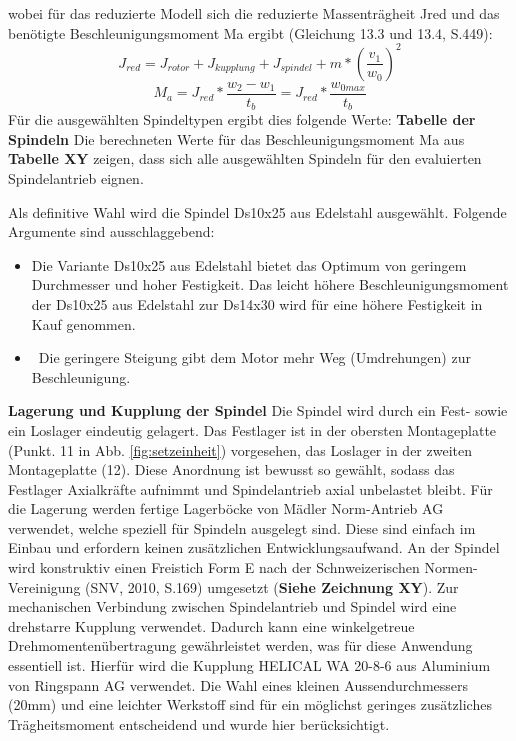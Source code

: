 wobei für das reduzierte Modell sich die reduzierte Massenträgheit Jred und das benötigte Beschleunigungsmoment Ma ergibt (Gleichung 13.3 und 13.4, S.449):
\begin{equation}
J_{red}=J_{rotor}+J_{kupplung}+J_{spindel}+m*(\frac{v_{1}}{w_{0}})^{2}
\end{equation}
\begin{equation}
M_{a}=J_{red}*\frac{w_{2}-w_{1}}{t_{b}}=J_{red}*\frac{w_{0max}}{t_{b}}
\end{equation}
Für die ausgewählten Spindeltypen ergibt dies folgende Werte:
\newline
\textbf{Tabelle der Spindeln}
Die berechneten Werte für das Beschleunigungsmoment Ma aus \textbf{Tabelle XY} zeigen, dass sich alle ausgewählten Spindeln für den evaluierten Spindelantrieb eignen.
\newline
\newline

Als definitive Wahl wird die Spindel Ds10x25 aus Edelstahl ausgewählt. Folgende Argumente sind ausschlaggebend:
	\begin{itemize}
	\item Die Variante Ds10x25 aus Edelstahl bietet das Optimum von geringem Durchmesser und hoher Festigkeit. Das leicht höhere Beschleunigungsmoment der Ds10x25 aus Edelstahl zur Ds14x30 wird für eine höhere Festigkeit in Kauf genommen.
	
	\item \ Die geringere Steigung gibt dem Motor mehr Weg (Umdrehungen) zur Beschleunigung.
\end{itemize}
\textbf{Lagerung und Kupplung der Spindel}
\newline
Die Spindel wird durch ein Fest- sowie ein Loslager eindeutig gelagert. Das Festlager ist in der obersten Montageplatte (Punkt. 11 in Abb. \ref{fig:setzeinheit}) vorgesehen, das Loslager in der zweiten Montageplatte (12). Diese Anordnung ist bewusst so gewählt, sodass das Festlager Axialkräfte aufnimmt und Spindelantrieb axial unbelastet bleibt. Für die Lagerung werden fertige Lagerböcke von Mädler Norm-Antrieb AG verwendet, welche speziell für Spindeln ausgelegt sind. Diese sind einfach im Einbau und erfordern keinen zusätzlichen Entwicklungsaufwand. An der Spindel wird konstruktiv einen Freistich Form E nach der Schnweizerischen Normen-Vereinigung (SNV, 2010, S.169) umgesetzt (\textbf{Siehe Zeichnung XY}).
\newline
Zur mechanischen Verbindung zwischen Spindelantrieb und Spindel wird eine drehstarre Kupplung verwendet. Dadurch kann eine winkelgetreue Drehmomentenübertragung gewährleistet werden, was für diese Anwendung essentiell ist. Hierfür wird die Kupplung HELICAL WA 20-8-6 aus Aluminium von Ringspann AG verwendet. Die Wahl eines kleinen Aussendurchmessers (20mm) und eine leichter Werkstoff sind für ein möglichst geringes zusätzliches Trägheitsmoment entscheidend und wurde hier berücksichtigt.
